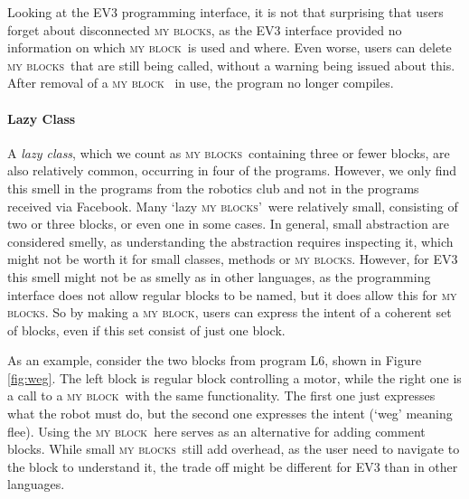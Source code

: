 \documentclass{sig-alternate}
\newcommand{\mbs}{\textsc{my blocks}}
\newcommand{\mb}{\textsc{my block}}
\begin{document}
Looking at the EV3 programming interface, it is not that surprising that users forget about disconnected \mbs, as the EV3 interface provided no information on which \mb~is used and where. Even worse, users can delete \mbs~that are still being called, without a warning being issued about this. After removal of a \mb~ in use, the program no longer compiles.



\paragraph{Lazy Class}
A \emph{lazy class}, which we count as \mbs~containing three or fewer blocks, are also relatively common, occurring in four of the programs. However, we only find this smell in the programs from the robotics club and not in the programs received via Facebook. Many `lazy \mbs'~were relatively small, consisting of two or three blocks, or even one in some cases. In general, small abstraction are considered smelly, as understanding the abstraction requires inspecting it, which might not be worth it for small classes, methods or \mbs. However, for EV3 this smell might not be as smelly as in other languages, as the programming interface does not allow regular blocks to be named, but it does allow this for \mbs. So by making a \mb, users can express the intent of a coherent set of blocks, even if this set consist of just one block. 

As an example, consider the two blocks from program L6, shown in Figure \ref{fig:weg}. The left block is regular block controlling a motor, while the right one is a call to a \mb~with the same functionality. The first one just expresses what the robot must do, but the second one expresses the intent (`weg' meaning flee). Using the \mb~here serves as an alternative for adding comment blocks. While small \mbs~still add overhead, as the user need to navigate to the block to understand it, the trade off might be different for EV3 than in other languages.

\end{document}
